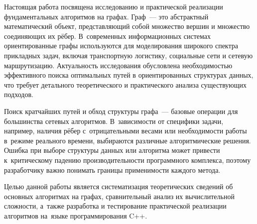 Настоящая работа посвящена исследованию и практической реализации фундаментальных алгоритмов на графах. Граф~--- это абстрактный математический объект, представляющий собой множество вершин и множество соединяющих их рёбер. В~современных информационных системах ориентированные графы используются для моделирования широкого спектра прикладных задач, включая транспортную логистику, социальные сети и сетевую маршрутизацию. Актуальность исследования обусловлена необходимостью эффективного поиска оптимальных путей в ориентированных структурах данных, что требует детального теоретического и практического анализа существующих подходов.

Поиск кратчайших путей и обход структуры графа~--- базовые операции для большинства сетевых алгоритмов. В~зависимости от специфики задачи, например, наличия рёбер с~отрицательными весами или необходимости работы в~режиме реального времени, выбираются различные алгоритмические решения. Ошибка при выборе структуры данных или алгоритма может привести к~критическому падению производительности программного комплекса, поэтому разработчику важно понимать границы применимости каждого метода.

Целью данной работы является систематизация теоретических сведений об основных алгоритмах на графах, сравнительный анализ их вычислительной сложности, а~также разработка и тестирование практической реализации алгоритмов на~языке программирования C++.
